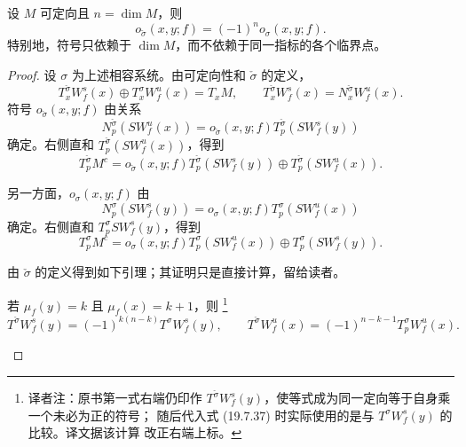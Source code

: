 \begin{proposition}
\label{prop:compare-two-morse-orientation-systems}
设 $M$ 可定向且 $n=\dim M$，则
\[
 o_{\check\sigma}(x,y;f)=(-1)^no_\sigma(x,y;f).
\]
特别地，符号只依赖于 $\dim M$，而不依赖于同一指标的各个临界点。
\end{proposition}

\begin{proof}
设 $\sigma$ 为上述相容系统。由可定向性和 $\check\sigma$ 的定义，
\[
 T_x^{\check\sigma}W_f^s(x)\oplus T_x^\sigma W_f^u(x)=T_xM,
 \qquad T_x^{\check\sigma}W_f^s(x)=N_x^{\check\sigma}W_f^u(x).
\]
符号 $o_{\check\sigma}(x,y;f)$ 由关系
\[
 N_p^{\check\sigma}(S W_f^u(x))
 =o_{\check\sigma}(x,y;f)T_p^{\check\sigma}(S W_f^s(y))
\]
确定。右侧直和 $T_p^{\check\sigma}(S W_f^u(x))$，得到
\begin{equation}
 T_p^{\check\sigma}M^c
 =o_{\check\sigma}(x,y;f)T_p^{\check\sigma}(S W_f^s(y))
 \oplus T_p^{\check\sigma}(S W_f^u(x)).
\label{eq:19-check-orientation-transverse-slice}
\end{equation}

另一方面，$o_\sigma(x,y;f)$ 由
\[
 N_p^\sigma(S W_f^s(y))=o_\sigma(x,y;f)T_p^\sigma(S W_f^u(x))
\]
确定。右侧直和 $T_p^\sigma S W_f^s(y)$，得到
\begin{equation}
 T_p^\sigma M^c=o_\sigma(x,y;f)T_p^\sigma(S W_f^u(x))
 \oplus T_p^\sigma(S W_f^s(y)).
\label{eq:19-sigma-orientation-transverse-slice}
\end{equation}

由 $\check\sigma$ 的定义得到如下引理；其证明只是直接计算，留给读者。

\begin{lemma}
\label{lem:check-sigma-orientation-comparison}
若 $\mu_f(y)=k$ 且 $\mu_f(x)=k+1$，则
\footnote{译者注：原书第一式右端仍印作
$T^{\check\sigma}W_f^s(y)$，使等式成为同一定向等于自身乘一个未必为正的符号；
随后代入式 (19.7.37) 时实际使用的是与 $T^\sigma W_f^s(y)$ 的比较。译文据该计算
改正右端上标。}
\[
 T^{\check\sigma}W_f^s(y)=(-1)^{k(n-k)}T^\sigma W_f^s(y),
 \qquad
 T^{\check\sigma}W_f^u(x)=(-1)^{n-k-1}T_p^\sigma W_f^u(x).
\]
\end{lemma}


\end{proof}
